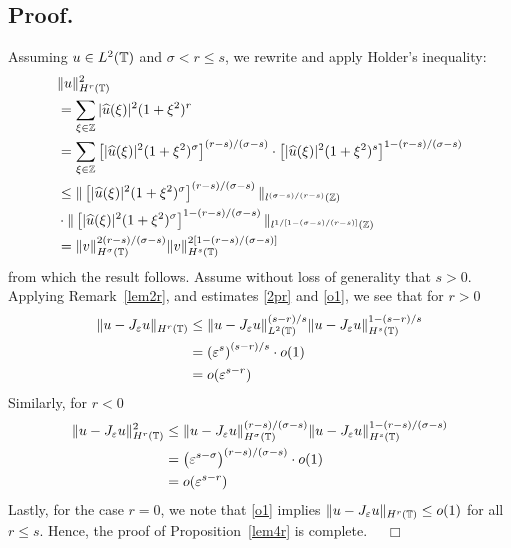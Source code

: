 \subsection{Proof.} Assuming $u \in L^2(\mathbb{T})$ and $\sigma < r \le s$,
we rewrite and apply Holder's inequality:
\begin{equation*}
\begin{split}
&\|u\|_{H^{r}(\mathbb{T})}^2
\\
& = \sum_{\xi \in \mathbb{Z}} |\widehat{u}(\xi)|^2 (1 + \xi^2)^{r}
\\
& = \sum_{\xi \in \mathbb{Z}}
\left [|\widehat{u}(\xi)|^2 (1 + \xi^2)^\sigma \right ]^{(r-s)/(\sigma -s)}
\cdot \left [ |\widehat{u}(\xi )
|^2 (1+ \xi^2)^s \right ] ^{1 - (r-s)/(\sigma -s)} 
\\
& \le \|\left[ |\widehat{u}(\xi)|^2 (1 + \xi^2)^\sigma
\right]^{(r-s)/(\sigma -s)} \|_{l^{(\sigma -s)/(r-s)}(\mathbb{Z})}
\\
& \cdot \|\left[ |\widehat{u}(\xi)|^2 (1 + \xi^2)^\sigma
\right]^{1- (r-s)/(\sigma -s)} \|_{l^{1/[1 -(\sigma -s)/(r-s)]}(\mathbb{Z})}
\\
& = \|v\|_{H^\sigma(\mathbb{T})}^{2(r-s)/(\sigma -s)}
\|v\|_{H^s(\mathbb{T})}^{2[1 - (r-s)/(\sigma -s)]}
\end{split}
\end{equation*}
from which the result follows. 
Assume without loss of generality that $s > 0$. Applying Remark~\ref{lem2r}, and estimates \eqref{2pr} and \eqref{o1}, we
see that for $r>0$ 
\begin{equation*}
\begin{split}
\|u - J_\varepsilon u \|_{H^r(\mathbb{T})}
& \le \|u - J_\varepsilon u
\|_{L^2(\mathbb{T})}^{(s-r)/s} \|u - J_\varepsilon u \|_{H^s(\mathbb{T})}^{1 -
(s-r)/s}
\\
& = \left( \varepsilon^{s} \right)^{(s-r)/s} \cdot o(1)
\\
& = o(\varepsilon^{s-r})
\end{split}
\end{equation*}
Similarly, for $r < 0$
\begin{equation*}
\begin{split}
\|u - J_\varepsilon u \|_{H^r(\mathbb{T})}^2
& \le \|u - J_\varepsilon u
\|_{H^\sigma(\mathbb{T})}^{(r-s)/(\sigma - s)} \|u - J_\varepsilon u \|_{H^s(\mathbb{T})}^{1 -
(r-s)/(\sigma -s)}
\\
& = \left( \varepsilon^{s-\sigma} \right)^{(r-s)/(\sigma -s)} \cdot o(1)
\\
& = o(\varepsilon^{s-r})
\end{split}
\end{equation*}
Lastly, for the case $r=0$, we note that \eqref{o1} implies $\|u - J_\varepsilon u
\|_{H^r(\mathbb{T})} \le o(1)$ for all $r \le s$. Hence, the proof of Proposition~\ref{lem4r} is complete.  $\quad \Box$
